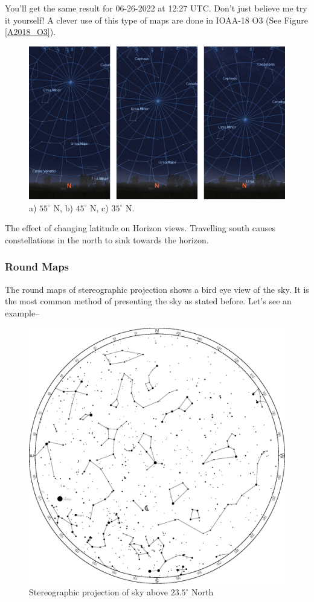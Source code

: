 \documentclass[a4paper,12pt]{extarticle}
\begin{document}
You'll get the same result for 06-26-2022 at 12:27 UTC. Don't just believe me try it yourself! A clever use of this type of maps are done in IOAA-18 O3 (See Figure \ref{A2018_O3}). 

\begin{figure}[H]
	\centering
	\includegraphics[width=0.9\linewidth]{skyhorizon.png}
	\caption{a) $55^\circ$ N, b) $45^\circ$ N, c) $35^\circ$ N.}
\end{figure}
The effect of changing latitude on Horizon views. Travelling south causes constellations in the north to sink towards the horizon.
\clearpage
\subsubsection{Round Maps}

The round maps of stereographic projection shows a bird eye view of the sky. It is the most common method of presenting the sky as stated before. Let's see an example--

\begin{figure}[H]
    \centering
    \includegraphics[width=0.9\linewidth]{stereo_1.eps}
    \caption{Stereographic projection of sky above $23.5^\circ$ North}
    \label{stereo_2}
\end{figure}
\end{document}
